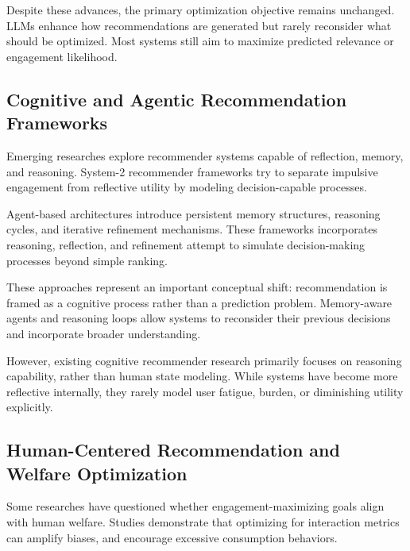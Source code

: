 Despite these advances, the primary optimization objective remains unchanged.
LLMs enhance how recommendations are generated but rarely reconsider what should be optimized.
Most systems still aim to maximize predicted relevance or engagement likelihood.
\cite{202512.0741,liang2026generativereasoningreranker}


\subsection{Cognitive and Agentic Recommendation Frameworks}

Emerging researches explore recommender systems
capable of reflection, memory, and reasoning.
System-2 recommender frameworks try to separate impulsive engagement
from reflective utility by modeling decision-capable processes.
\cite{Agarwal2024System2RD}

Agent-based architectures introduce persistent memory structures, 
reasoning cycles, and iterative refinement mechanisms.
\cite{yang2026graphbasedagentmemorytaxonomy}
These frameworks incorporates reasoning, reflection, and refinement 
attempt to simulate decision-making processes beyond simple ranking.
\cite{gu2025r4ecreasoningreflectionrefinement}

These approaches represent an important conceptual shift: recommendation 
is framed as a cognitive process rather than a prediction problem.
Memory-aware agents and reasoning loops allow systems to reconsider
their previous decisions and incorporate broader understanding.
\cite{yang2026graphbasedagentmemorytaxonomy}

However, existing cognitive recommender research primarily focuses 
on reasoning capability, rather than human state modeling.
While systems have become more reflective internally, they rarely model 
user fatigue, burden, or diminishing utility explicitly.
\cite{Carroll2025CTRLRecCR}


\subsection{Human-Centered Recommendation and Welfare Optimization}

Some researches have questioned whether engagement-maximizing 
goals align with human welfare.
Studies demonstrate that optimizing for interaction metrics can 
amplify biases, and encourage excessive consumption behaviors.
\cite{Milli2023EngagementUS,Anwar2024RecommendationAT}

